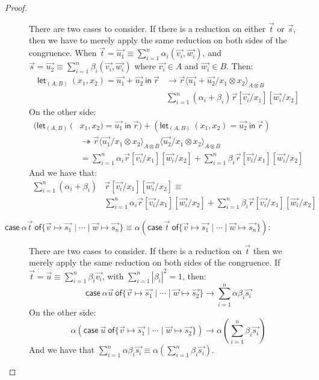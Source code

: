 \documentclass[runningheads,orivec]{llncs}
\newcommand\ansubst[2]{\ensuremath{\langle #1 \rangle_{#2}}}
\def\Pair#1#2{(#1,#2)} %
\def\letkeyword{\mathsf{let}}
\def\inkeyword{\mathsf{in}}
\def\LetP#1#2#3#4#5#6{\letkeyword_{\Pair{#2}{#4}}~\Pair{#1}{#3}=#5~\inkeyword~#6}
\def\gencase#1#2#3#4#5{\ensuremath{\mathsf{case}~#1~\mathsf{of} \{#2\mapsto #4 \mid \dotsb \mid #3\mapsto #5\}}}
\def\evalone{\rightarrow}
\def\eval{\twoheadrightarrow}
\begin{document}
\begin{proof}
\begin{description}
    There are two cases to consider. If there is a reduction on either $\vec{t}$ or $\vec{s}$, then we have to merely apply the same reduction on both sides of the congruence. When $\vec{t}=\vec{u_1}\equiv\sum_{i=1}^{n}\alpha_i\Pair{\vec{v_i}}{\vec{w_i}}$, and $\vec{s}=\vec{u_2}\equiv\sum_{i=1}^{n}\beta_i\Pair{\vec{v_i}}{\vec{w_i}}$ where $\vec{v_i}\in A$ and $\vec{w_i}\in B$. Then:
    \begin{align*}
      \LetP{x_1}{A}{x_2}{B}{\vec{u_1}+\vec{u_2}}{\vec{r}}&\evalone\vec{r}\ansubst{\vec{u_1}+\vec{u_2}/x_1\otimes x_2}{A\otimes B}\\
      &\sum_{i=1}^{n} (\alpha_i + \beta_i) \vec{r}[\vec{v_i}/x_1][\vec{w_i}/x_2]
    \end{align*}
    On the other side:
    \begin{align*}
      (\LetP{&x_1}{A}{x_2}{B}{\vec{u_1}}{\vec{r}})+(\LetP{x_1}{A}{x_2}{B}{\vec{u_2}}{\vec{r}})\\
      &\eval\vec{r}\ansubst{\vec{u_1}/x_1\otimes x_2}{A\otimes B}\ansubst{\vec{u_2}/x_1\otimes x_2}{A\otimes B}\\
      &=\sum_{i=1}^{n}\alpha_i \vec{r}[\vec{v_i}/x_1][\vec{w_i}/x_2] + \sum_{i=1}^{n}\beta_i\vec{r}[\vec{v_i}/x_1][\vec{w_i}/x_2]
    \end{align*}
    And we have that:
    \begin{align*}
      \sum_{i=1}^{n}(\alpha_i + \beta_i) &\vec{r}[\vec{v_i}/x_1][\vec{w_i}/x_2]\equiv\\
      &\sum_{i=1}^{n}\alpha_i \vec{r}[\vec{v_i}/x_1][\vec{w_i}/x_2] + \sum_{i=1}^{n}\beta_i \vec{r}[\vec{v_i}/x_1][\vec{w_i}/x_2]
    \end{align*}

  \item[$\gencase{\alpha \vec{t}}{\vec{v}}{\vec{w}}{\vec{s_1}}{\vec{s_n}}\equiv
  \alpha(\gencase{\vec{t}}{\vec{v}}{\vec{w}}{\vec{s_1}}{\vec{s_n}})$:] 
  There are two cases to consider. If there is a reduction on $\vec{t}$ then we merely apply the same reduction on both sides of the congruence. If $\vec{t}=\vec{u}\equiv\sum_{i=1}^{n}\beta_i \vec{v_i}$, with $\sum_{i=1}^{n}|\beta_i|^2=1$, then:
  \[
  \gencase{\alpha \vec{u}}{\vec{v}}{\vec{w}}{\vec{s_1}}{\vec{s_2}}\evalone
  \sum_{i=1}^{n}\alpha\beta_i \vec{s_i}
  \]
  On the other side:
  \[
  \alpha(\gencase{\vec{u}}{\vec{v}}{\vec{w}}{\vec{s_1}}{\vec{s_2}})\evalone
  \alpha(\sum_{i=1}^{n}\beta_i \vec{s_i})
  \]
  And we have that $\sum_{i=1}^{n}\alpha\beta_i \vec{s_i}\equiv\alpha(\sum_{i=1}^{n}\beta_i \vec{s_i})$.


\end{description}
\end{proof}
\end{document}
